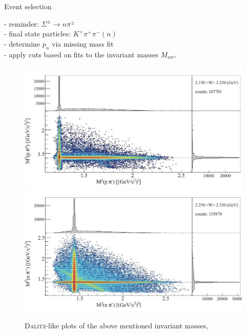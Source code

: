\documentclass[11pt,aspectratio=1610,dvipsnames]{beamer}
\begin{document}
\begin{frame}{Event selection}
\begin{minipage}{.49\linewidth}
\begin{tcolorbox}[colback=black!10,colframe=gray!20!black,title=extracting $\Lambda\pi^0$ and $\Sigma^+\pi^-$]
			
	\end{tcolorbox}	
\end{minipage}
\begin{minipage}{.49\linewidth}
	\begin{tcolorbox}[colback=black!10,colframe=gray!20!black,title=extracting $\Sigma^+\pi^-$ and $\Sigma^-\pi^+$] 
	- reminder: $\Sigma^\pm\to n\pi^\pm$\\
	- final state particles: $K^+\pi^+\pi^-(n)$\\
	- determine $p_n$ via missing mass fit\\
	- apply cuts based on fits to the invariant masses $M_{n\pi^\pm}$
	\end{tcolorbox}	
\end{minipage}
\begin{figure}[H]
	\centering
	\includegraphics[width=.49\linewidth]{inv_mass_1}
	\includegraphics[width=.49\linewidth]{inv_mass_2}
	\caption*{\textsc{Dalitz}-like plots of the above mentioned invariant masses,  \citet{lineshapes}}
\end{figure}
\end{frame}
\end{document}
